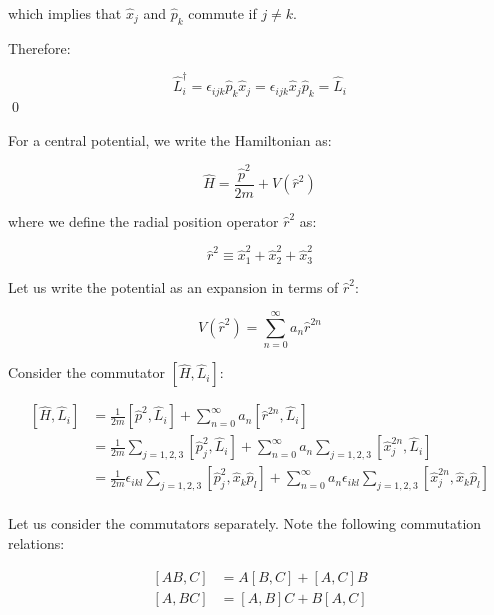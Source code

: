 \documentclass[12pt]{article}
\begin{document}
which implies that $\hat{x}_{j}$ and $\hat{p}_{k}$ commute if $j \neq k$. 

Therefore:

\begin{equation}
    \hat{L}_{i}^{\dagger} = \epsilon_{ijk} \hat{p}_{k} \hat{x}_{j} = \epsilon_{ijk} \hat{x}_{j} \hat{p}_{k} = \hat{L}_{i}
\end{equation}
\qed


For a central potential, we write the Hamiltonian as:

\begin{equation}
    \hat{H} = \frac{\hat{p}^{2}}{2m} + V(\hat{r}^{2})
\end{equation}

where we define the radial position operator $\hat{r}^{2}$ as:

\begin{equation}
    \hat{r}^{2} \equiv \hat{x}_{1}^{2} + \hat{x}_{2}^{2} + \hat{x}_{3}^{2}
\end{equation}

Let us write the potential as an expansion in terms of $\hat{r}^{2}$:

\begin{equation}
    V(\hat{r}^{2}) = \sum_{n=0}^{\infty} a_{n} \hat{r}^{2n}
\end{equation}

Consider the commutator $[\hat{H}, \hat{L}_{i}]$:

\begin{equation}
\begin{split}
    [\hat{H}, \hat{L}_{i}] &= \frac{1}{2m} [\hat{p}^{2}, \hat{L}_{i}] + \sum_{n = 0}^{\infty} a_{n} [\hat{r}^{2n}, \hat{L}_{i}] \\
    &= \frac{1}{2m} \sum_{j = 1, 2, 3} [\hat{p}_{j}^{2}, \hat{L}_{i}] + \sum_{n = 0}^{\infty} a_{n} \sum_{j = 1, 2, 3} [\hat{x}_{j}^{2n}, \hat{L}_{i}] \\
    &= \frac{1}{2m} \epsilon_{ikl} \sum_{j = 1, 2, 3} [\hat{p}_{j}^{2}, \hat{x}_{k} \hat{p}_{l}] + \sum_{n = 0}^{\infty} a_{n} \epsilon_{ikl} \sum_{j = 1, 2, 3} [\hat{x}_{j}^{2n}, \hat{x}_{k} \hat{p}_{l}] \\
\end{split}
\end{equation}

Let us consider the commutators separately. Note the following commutation relations:

\begin{equation}
\begin{split}
    [AB, C] &= A[B, C] + [A, C]B \\
    [A, BC] &= [A, B]C + B[A, C]
\end{split}
\end{equation}
\end{document}
